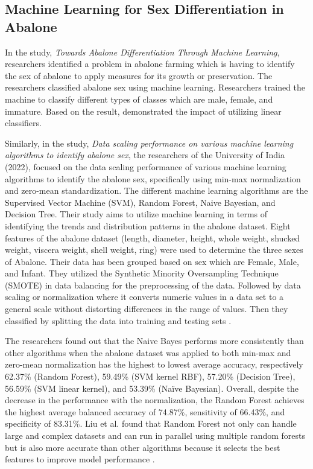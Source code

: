 \subsection{Machine Learning for Sex Differentiation in Abalone}
In the study, \textit{Towards Abalone Differentiation Through Machine Learning}, researchers identified a problem in abalone farming which is having to identify the sex of abalone to apply measures for its growth or preservation. The researchers classified abalone sex using machine learning. Researchers trained the machine to classify different types of classes which are male, female, and immature. Based on the result, demonstrated the impact of utilizing linear classifiers. 

Similarly, in the study, \textit{Data scaling performance on various machine learning algorithms to identify abalone sex}, the researchers of the University of India (2022), focused on the data scaling performance of various machine learning algorithms to identify the abalone sex, specifically using min-max normalization and zero-mean standardization. The different machine learning algorithms are the Supervised Vector Machine (SVM), Random Forest, Naive Bayesian, and Decision Tree. Their study aims to utilize machine learning in terms of identifying the trends and distribution patterns in the abalone dataset. Eight features of the abalone dataset (length, diameter, height, whole weight, shucked weight, viscera weight, shell weight, ring) were used to determine the three sexes of Abalone. Their data has been grouped based on sex which are Female, Male, and Infant. They utilized the Synthetic Minority Oversampling Technique (SMOTE) in data balancing for the preprocessing of the data. Followed by data scaling or normalization where it converts numeric values in a data set to a general scale without distorting differences in the range of values. Then they classified by splitting the data into training and testing sets \cite{arifin2021}. 

The researchers found out that the Naive Bayes performs more consistently than other algorithms when the abalone dataset was applied to both min-max and zero-mean normalization has the highest to lowest average accuracy, respectively 62.37\% (Random Forest), 59.49\% (SVM kernel RBF), 57.20\% (Decision Tree), 56.59\% (SVM linear kernel), and 53.39\% (Naïve Bayesian). Overall, despite the decrease in the performance with the normalization, the Random Forest achieves the highest average balanced accuracy of 74.87\%, sensitivity of 66.43\%, and specificity of 83.31\%. Liu et al. found that Random Forest not only can handle large and complex datasets and can run in parallel using multiple random forests but is also more accurate than other algorithms because it selects the best features to improve model performance \cite{arifin2021}. 

